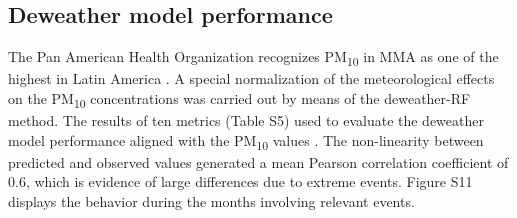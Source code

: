 \documentclass[preprint,12pt]{elsarticle}
\begin{document}
\subsection{Deweather model performance}
The Pan American Health Organization recognizes PM\textsubscript{10} in MMA as one of the highest in Latin America \citep{Riojas-Rodriguez2016}. A special normalization of the meteorological effects on the PM\textsubscript{10} concentrations was carried out by means of the deweather-RF method. The results of ten metrics (Table S5) used to evaluate the deweather model performance aligned with the PM\textsubscript{10} values \citep{Lv_2022}. The non-linearity between predicted and observed values generated a mean Pearson correlation coefficient of 0.6, which is evidence of large differences due to extreme events. Figure S11 displays the behavior during the months involving relevant events. 
\end{document}
